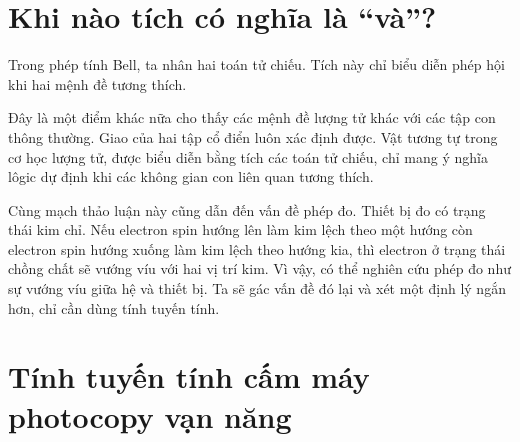 \section{Khi nào tích có nghĩa là “và”?}

Trong phép tính Bell, ta nhân hai toán tử chiếu. Tích này chỉ biểu diễn phép hội khi hai mệnh đề tương thích.

\begin{classroomqa}
\end{classroomqa}

Đây là một điểm khác nữa cho thấy các mệnh đề lượng tử khác với các tập con thông thường. Giao của hai tập cổ điển luôn xác định được. Vật tương tự trong cơ học lượng tử, được biểu diễn bằng tích các toán tử chiếu, chỉ mang ý nghĩa lôgic dự định khi các không gian con liên quan tương thích.

Cùng mạch thảo luận này cũng dẫn đến vấn đề phép đo. Thiết bị đo có trạng thái kim chỉ. Nếu electron spin hướng lên làm kim lệch theo một hướng còn electron spin hướng xuống làm kim lệch theo hướng kia, thì electron ở trạng thái chồng chất sẽ vướng víu với hai vị trí kim. Vì vậy, có thể nghiên cứu phép đo như sự vướng víu giữa hệ và thiết bị. Ta sẽ gác vấn đề đó lại và xét một định lý ngắn hơn, chỉ cần dùng tính tuyến tính.

\begin{classroomqa}
\end{classroomqa}

\section{Tính tuyến tính cấm máy photocopy vạn năng}

